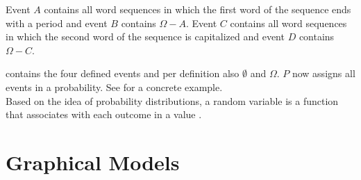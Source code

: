 Event $A$ contains all word sequences in which the first word of the sequence ends with a period and event $B$ contains $\Omega - A$.
Event $C$ contains all word sequences in which the second word of the sequence is capitalized and event $D$ contains $\Omega - C$.

 contains the four defined events and per definition also $\emptyset$ and $\Omega$.
$P$ now assigns all events in  a probability.
See  for a concrete example.\\

Based on the idea of \glspl{probability distribution}, a \gls{random variable} is a \gls{function} that associates with each outcome in  a value \cite{koller2009probabilistic}.










\section{Graphical Models}\label{sec:graphical-models}

